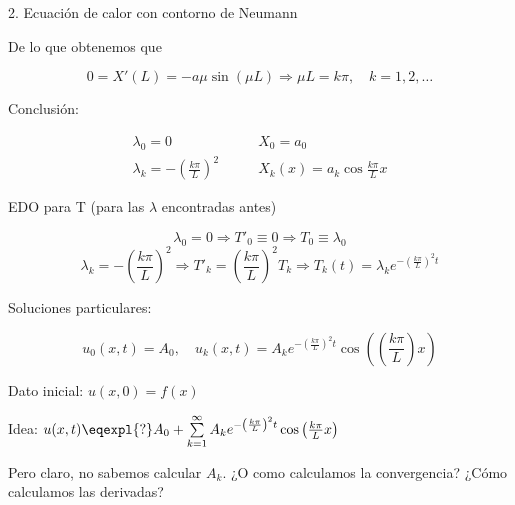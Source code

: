\begin{example}{2. Ecuación de calor con contorno de Neumann}
\begin{itemize}
			 	De lo que obtenemos que

			 	\[0 = X'(L) = -a \mu \sin(\mu L) \Rightarrow \mu L = k \pi , \quad k = 1,2,…\]



		\end{itemize}

		Conclusión:

				\begin{align*}
					\lambda_0 = 0\quad & \quad X_0 = a_0 \\
					\lambda_k = - \left(\frac{k\pi}{L}\right)^2\quad & \quad X_k(x) = a_k \cos \frac{k \pi}{L}x
				\end{align*}

			 	EDO para T (para las $\lambda$ encontradas antes)

			 	\[\lambda_0 = 0 \Rightarrow T'_0 \equiv 0 \Rightarrow T_0 \equiv \lambda_0\]
			 	\[\lambda_k = - \left(\frac{k\pi}{L}\right)^2 \Rightarrow T'_k = \left(\frac{k\pi}{L}\right)^2 T_k \Rightarrow T_k (t) = \lambda_k e^{-\left(\frac{k\pi}{L}\right)^2 t} \]

			 	Soluciones particulares:

			 	\[u_0(x,t) = A_0, \quad u_k (x,t) = A_k e^{-\left(\frac{k \pi}{L} \right)^2 t} \cos \left( \left( \frac{k \pi}{L}\right) x \right) \]

			 	Dato inicial: $u(x,0) = f(x)$

			 	Idea: $u(x,t) \eqexpl{?} A_0 + \sum\limits_{k=1}^{\infty} A_k e^{- \left( \frac{k \pi}{L} \right)^2 t}  \cos \left( \frac{k \pi}{L} x \right)$

			 	Pero claro, no sabemos calcular $A_k$. ¿O como calculamos la convergencia? ¿Cómo calculamos las derivadas?


		\end{example}


